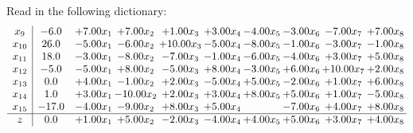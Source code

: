 \documentclass[9pt]{article}
\begin{document}
Read in the following dictionary:
\[\begin{array}{c| c c@{\hskip 2pt} c@{\hskip 2pt} c@{\hskip 2pt} c@{\hskip 2pt} c@{\hskip 2pt} c@{\hskip 2pt} c@{\hskip 2pt} c@{\hskip 2pt} }
 x_{9}   &  -6.0 & +  7.00 x_{1} & +  7.00 x_{2} & +  1.00 x_{3} & +  3.00 x_{4} & -4.00 x_{5} & -3.00 x_{6} & -7.00 x_{7} & +  7.00 x_{8}\\
 x_{10}   &  26.0 & -5.00 x_{1} & -6.00 x_{2} & + 10.00 x_{3} & -5.00 x_{4} & -8.00 x_{5} & -1.00 x_{6} & -3.00 x_{7} & -1.00 x_{8}\\
 x_{11}   &  18.0 & -3.00 x_{1} & -8.00 x_{2} & -7.00 x_{3} & -1.00 x_{4} & -6.00 x_{5} & -4.00 x_{6} & +  3.00 x_{7} & +  5.00 x_{8}\\
 x_{12}   &  -5.0 & -5.00 x_{1} & +  8.00 x_{2} & -5.00 x_{3} & +  8.00 x_{4} & -3.00 x_{5} & +  6.00 x_{6} & + 10.00 x_{7} & +  2.00 x_{8}\\
 x_{13}   &  0.0 & +  4.00 x_{1} & -1.00 x_{2} & +  2.00 x_{3} & -5.00 x_{4} & +  5.00 x_{5} & -2.00 x_{6} & +  1.00 x_{7} & +  6.00 x_{8}\\
 x_{14}   &  1.0 & +  3.00 x_{1} & -10.00 x_{2} & +  2.00 x_{3} & +  3.00 x_{4} & +  8.00 x_{5} & +  5.00 x_{6} & +  1.00 x_{7} & -5.00 x_{8}\\
 x_{15}   &  -17.0 & -4.00 x_{1} & -9.00 x_{2} & +  8.00 x_{3} & +  5.00 x_{4} &   & -7.00 x_{6} & +  4.00 x_{7} & +  8.00 x_{8}\\
\hline
z    &  0.0 & +  1.00 x_{1} & +  5.00 x_{2} & -2.00 x_{3} & -4.00 x_{4} & +  4.00 x_{5} & +  5.00 x_{6} & +  3.00 x_{7} & +  4.00 x_{8}\\
\end{array}\]
\end{document}
